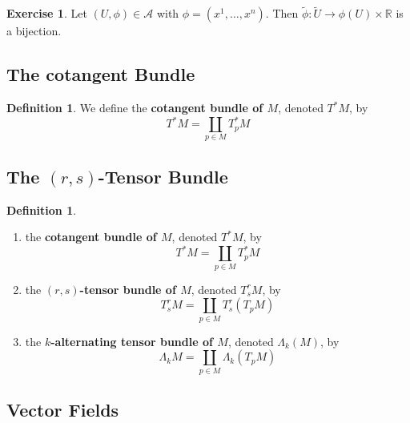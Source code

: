 \documentclass[12pt]{amsart}
\theoremstyle{definition}
\newtheorem{defn}[definition]{Definition}
\newtheorem{ex}[definition]{Exercise}
\newcommand{\Lam}{\Lambda}
\newcommand{\R}{\mathbb{R}}
\newcommand{\MA}{\mathcal{A}}
\newcommand{\tU}{\tilde{U}}
\newcommand{\tphi}{\tilde{\phi}}
\begin{document}
	\begin{ex}
		Let $(U, \phi) \in \MA$ with $\phi = (x^1, \dots, x^n)$. Then $\tphi:\tU \rightarrow \phi(U) \times \R$ is a bijection. 
	\end{ex}














	\newpage
	\subsection{The cotangent Bundle}
	
	\begin{defn}
		We define the \textbf{cotangent bundle of $M$}, denoted $T^*M$, by 
		$$T^*M = \coprod_{p \in M} T_p^*M$$ 
	\end{defn}





	
	
	
	
	
	
	
	
	
	
	\subsection{The $(r,s)$-Tensor Bundle}
	
	\begin{defn}
	\begin{enumerate}
		\item the \textbf{cotangent bundle of $M$}, denoted $T^*M$, by 
		$$T^*M = \coprod_{p \in M} T_p^*M$$
		\item the \textbf{$(r,s)$-tensor bundle of $M$}, denoted $T^r_sM$, by
	$$T^r_s M = \coprod_{p \in M} T^r_s(T_p M)$$
	\item the \textbf{$k$-alternating tensor bundle of $M$}, denoted $\Lam_k(M)$, by
	$$\Lam_kM = \coprod_{p \in M} \Lam_k(T_pM)$$
		\end{enumerate}
	\end{defn}
	
	
	
	
	
	
	
	
	
	
	
	
	
	
	\newpage	
	\subsection{Vector Fields}
	
\end{document}
